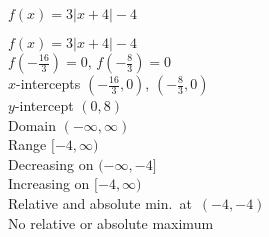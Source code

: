 {$f(x) =3|x + 4| - 4$}
{$f(x) = 3|x + 4| - 4$ \\ $f\left(-\frac{16}{3}\right) = 0$,  $f\left(-\frac{8}{3}\right) = 0$\\ $x$-intercepts $\left(-\frac{16}{3}, 0\right)$, $\left(-\frac{8}{3}, 0\right)$ \\ $y$-intercept $(0, 8)$ \\ Domain $(-\infty, \infty)$ \\ Range $[-4, \infty)$ \\ Decreasing on $(-\infty, -4]$ \\ Increasing on $[-4, \infty)$ \\ Relative and absolute min.~at~$(-4,-4)$ \\ No relative or absolute maximum  

\begin{center}
\end{center}}